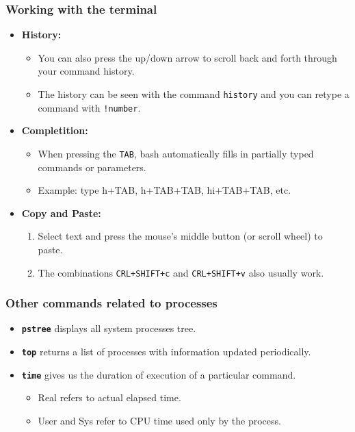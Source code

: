 \begin{frame}[fragile]\frametitle{Working with the terminal}
\begin{itemize}
\item \textbf{History:}
  \begin{itemize}
  \item You can also press the up/down arrow to scroll back 
  and forth through your command history.
  \item The history can be seen with the command \texttt{history} 
  and you can retype a command with \texttt{!number}.
  \end{itemize}
\item \textbf{Completition:} 
  \begin{itemize}
  \item When pressing the \texttt{TAB}, bash automatically fills 
  in partially typed commands or parameters.
  \item Example: type h+TAB, h+TAB+TAB, hi+TAB+TAB, etc.
  \end{itemize}
\item \textbf{Copy and Paste:} 
  \begin{enumerate}
  \item Select text and press the mouse's middle button (or scroll wheel) to paste.
  \item The combinations \texttt{CRL+SHIFT+c} and \texttt{CRL+SHIFT+v} also usually work.
  \end{enumerate}
\end{itemize}
\end{frame}

\begin{frame}\frametitle{Other commands related to processes}
\begin{itemize}
\item \texttt{\textbf{pstree}} displays all system processes tree.
\item \texttt{\textbf{top}} returns a list of processes with information 
updated periodically. 
\item \texttt{\textbf{time}} gives us the duration of execution 
of a particular command.
  \begin{itemize}
  \item Real refers to actual elapsed time. 
  \item User and Sys refer to CPU time used only by the process.
  \end{itemize}
\end{itemize}
\end{frame}

